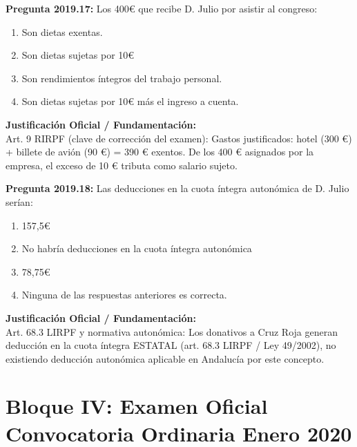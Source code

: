 \documentclass[11pt,a4paper,openany]{article}
\begin{document}
\noindent\textbf{\sffamily Pregunta 2019.17:} Los 400\euro{} que recibe D. Julio por asistir al congreso:\\[0.15cm]
\begin{enumerate}[label=\textbf{\alph*)},leftmargin=1.8em,itemsep=1.5pt,topsep=2pt,partopsep=0pt,parsep=0pt]
    \item Son dietas exentas.
    \item Son dietas sujetas por 10\euro{}
    \item Son rendimientos íntegros del trabajo personal.
    \item Son dietas sujetas por 10\euro{} más el ingreso a cuenta.
\end{enumerate}
\begin{solucionBox}
\textbf{Justificación Oficial / Fundamentación:}\\[0.1cm]
Art. 9 RIRPF (clave de corrección del examen): Gastos justificados: hotel (300 \euro{}) + billete de avión (90 \euro{}) = 390 \euro{} exentos. De los 400 \euro{} asignados por la empresa, el exceso de 10 \euro{} tributa como salario sujeto.
\end{solucionBox}
\vspace{0.35cm}

\noindent\textbf{\sffamily Pregunta 2019.18:} Las deducciones en la cuota íntegra autonómica de D. Julio serían:\\[0.15cm]
\begin{enumerate}[label=\textbf{\alph*)},leftmargin=1.8em,itemsep=1.5pt,topsep=2pt,partopsep=0pt,parsep=0pt]
    \item 157,5\euro{}
    \item No habría deducciones en la cuota íntegra autonómica
    \item 78,75\euro{}
    \item Ninguna de las respuestas anteriores es correcta.
\end{enumerate}
\begin{solucionBox}
\textbf{Justificación Oficial / Fundamentación:}\\[0.1cm]
Art. 68.3 LIRPF y normativa autonómica: Los donativos a Cruz Roja generan deducción en la cuota íntegra ESTATAL (art. 68.3 LIRPF / Ley 49/2002), no existiendo deducción autonómica aplicable en Andalucía por este concepto.
\end{solucionBox}
\vspace{0.35cm}

\newpage
\section{Bloque IV: Examen Oficial Convocatoria Ordinaria Enero 2020}
\label{sec:examen2020}
\end{document}
